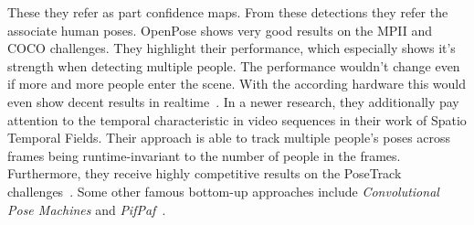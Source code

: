     These they refer as part confidence maps.
    From these detections they refer the associate human poses.
    OpenPose shows very good results on the MPII and COCO challenges.
    They highlight their performance, which especially shows it's strength when detecting multiple people.
    The performance wouldn't change even if more and more people enter the scene.
    With the according hardware this would even show decent results in realtime~\cite{openpose}.
    In a newer research, they additionally pay attention to the temporal characteristic in video sequences in
    their work of Spatio Temporal Fields.
    Their approach is able to track multiple people's poses across frames being runtime-invariant to the number
    of people in the frames.
    Furthermore, they receive highly competitive results on the PoseTrack challenges~\cite{staf}.
    Some other famous bottom-up approaches include \textit{Convolutional Pose Machines} and
    \textit{PifPaf}~\cite{convpose, pifpaf}.\\
    \par

